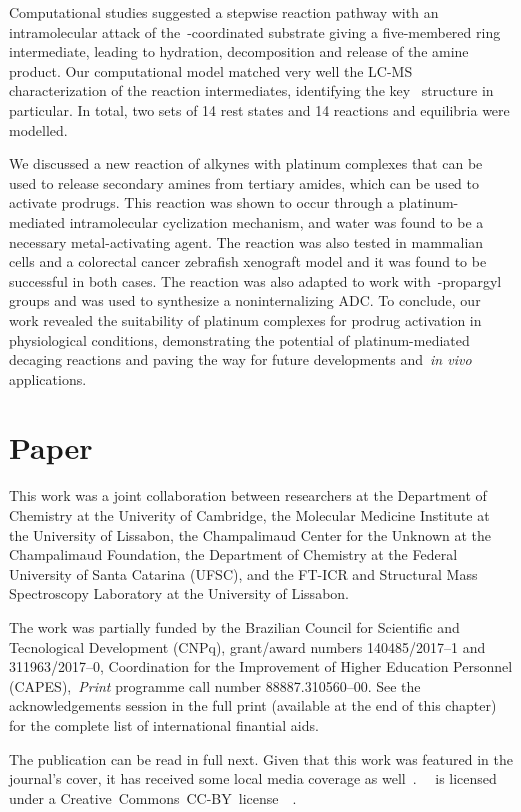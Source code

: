 Computational studies suggested a stepwise reaction pathway with an intramolecular attack
of the~-coordinated substrate giving a five-membered ring intermediate,
leading to hydration,
decomposition and release of the amine product.
Our computational model matched very well the LC-MS characterization of the reaction intermediates,
identifying the key~ structure in particular.
In total, two sets of 14 rest states and 14 reactions and equilibria were modelled.

We discussed a new reaction of alkynes with platinum complexes that can be used to release secondary amines from tertiary amides,
which can be used to activate prodrugs.
This reaction was shown to occur through a platinum-mediated intramolecular cyclization mechanism,
and water was found to be a necessary metal-activating agent.
The reaction was also tested in mammalian cells and a colorectal cancer zebrafish xenograft model
and it was found to be successful in both cases.
The reaction was also adapted to work with~-propargyl groups and was used to synthesize a noninternalizing ADC.\@
To conclude,
our work revealed the suitability of platinum complexes for prodrug activation in physiological conditions,
demonstrating the potential of platinum-mediated decaging reactions
and paving the way for future developments and~\emph{in vivo} applications.

\section{Paper}

This work was a joint collaboration between researchers
at the Department of Chemistry at the Univerity of Cambridge,
the Molecular Medicine Institute at the University of Lissabon,
the Champalimaud Center for the Unknown at the Champalimaud Foundation,
the Department of Chemistry at the Federal University of Santa Catarina (UFSC),
and the FT-ICR and Structural Mass Spectroscopy Laboratory at the University of Lissabon.

The work was partially funded by the Brazilian Council for Scientific and Tecnological Development (CNPq),
grant/award numbers 140485/2017--1 and 311963/2017--0,
Coordination for the Improvement of Higher Education Personnel (CAPES),~\emph{Print} programme call number 88887.310560--00.
See the acknowledgements session in the full print
(available at the end of this chapter)
for the complete list of international finantial aids.

The publication can be read in full next.
Given that this work was featured in the journal's cover,
it has received some local media coverage as well~\cite{noticias-da-ufsc2020}.~\citeauthor{Oliveira_2020}~\cite{Oliveira_2020}
is licensed under a
Creative~Commons~CC-BY~license~\ccby~\cite{ACS_CCBY_2014}.


